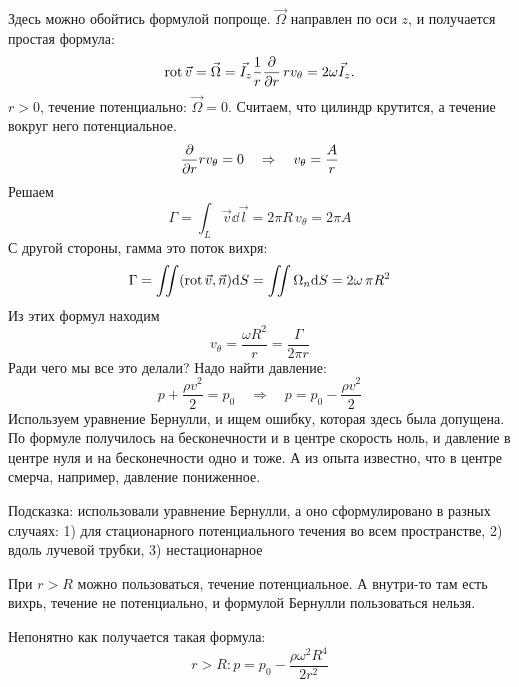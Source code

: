 Здесь можно обойтись формулой попроще. $\vec{\Omega}$ направлен по оси $z$, и получается простая формула: 
\begin{equation}
	\operatorname{rot}\vec{v}=
		\vec\Omega=
		\vec{I}_z \frac{1}{r}\pdv{r}\,rv_\theta=
		2\omega\vec{I}_z.
\end{equation}
$r>0$, течение потенциально: $\vec{\Omega}=0$. Считаем, что цилиндр крутится, а течение вокруг него потенциальное.
\begin{equation}
 	\pdv{r} rv_\theta=0 \quad \Rightarrow \quad v_\theta=\frac{A}{r}
 \end{equation} 
Решаем
\begin{equation}
	\Gamma=\int_L \vec{v}\dd\vec{l}=2\pi R\, v_\theta= 2\pi A
\end{equation}
С другой стороны, гамма это поток вихря:
\begin{equation}
	\Gamma=\iint (\operatorname{rot}\vec{v}, \vec{n})\dd S =\iint  \Omega_n \dd S = 2\omega\, \pi R^2
\end{equation}
Из этих формул находим
\begin{equation}
	v_\theta=\frac{\omega R^2}{r}=\frac{\Gamma}{2\pi r}
\end{equation}
Ради чего мы все это делали? Надо найти давление:
\begin{equation}
	p+\frac{\rho v^2}{2}=p_0 \quad \Rightarrow \quad
	p=p_0-\frac{\rho v^2}{2}
\end{equation}
Используем уравнение Бернулли, и ищем ошибку, которая здесь была допущена. По формуле получилось на бесконечности и в центре скорость ноль, и давление в центре нуля и на бесконечности одно и тоже. А из опыта известно, что в центре смерча, например, давление пониженное.

Подсказка: использовали уравнение Бернулли, а оно сформулировано в разных случаях: 1) для стационарного потенциального течения во всем пространстве, 2) вдоль лучевой трубки, 3) нестационарное

При $r>R$ можно пользоваться, течение потенциальное. А внутри-то там есть вихрь, течение не потенциально, и формулой Бернулли пользоваться нельзя.

Непонятно как получается такая формула:
\begin{equation}
	r>R: p=p_0-\frac{\rho\omega^2 R^4}{2r^2}
\end{equation}

